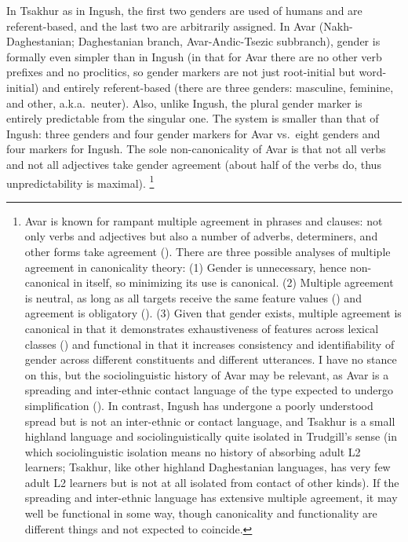\documentclass[output=collectionpaper]{langsci/langscibook}
\begin{document}
In Tsakhur as in Ingush, the first two genders are used of humans and are referent-based, and the last two are arbitrarily assigned. In Avar (Nakh\hyp{}Daghestanian; Daghestanian branch, Avar-Andic-Tsezic subbranch), gender is formally even simpler than in Ingush (in that for Avar there are no other verb prefixes and no proclitics, so gender markers are not just root-initial but word-initial) and entirely referent-based (there are three genders: masculine, feminine, and other, a.k.a.\ neuter). Also, unlike Ingush, the plural gender marker is entirely predictable from the singular one. The system is smaller than that of Ingush: three genders and four gender markers for Avar vs.\ eight genders and four markers for Ingush. The sole non-canonicality of Avar is that not all verbs and not all adjectives take gender agreement (about half of the verbs do, thus unpredictability is maximal).%
\footnote{%
\label{fn:Nich:8}%
Avar is known for rampant multiple agreement in phrases and clauses: not only verbs and adjectives but also a number of adverbs, determiners, and other forms take agreement (\citealt{Kibrik1985,Kibrik2003}). There are three possible analyses of multiple agreement in canonicality theory: (1) Gender is unnecessary, hence non-canonical in itself, so minimizing its use is canonical. (2) Multiple agreement is neutral, as long as all targets receive the same feature values (\citealt[513]{Corbett2016}) and agreement is obligatory (\citealt[14--15]{Corbett2006}). (3) Given that gender exists, multiple agreement is canonical in that it demonstrates exhaustiveness of features across lexical classes (\citealt[54]{Corbett2013c}) and functional in that it increases consistency and identifiability of gender across different constituents and different utterances. I have no stance on this, but the sociolinguistic history of Avar may be relevant, as Avar is a spreading and inter-ethnic contact language of the type expected to undergo simplification (\citealt{Trudgill2011}).  In contrast, Ingush has undergone a poorly understood spread but is not an inter-ethnic or contact language, and Tsakhur is a small highland language and sociolinguistically quite isolated in Trudgill's sense (in which sociolinguistic isolation means no history of absorbing adult L2 learners; Tsakhur, like other highland Daghestanian languages, has very few adult L2 learners but is not at all isolated from contact of other kinds). If the spreading and inter-ethnic language has extensive multiple agreement, it may well be functional in some way, though canonicality and functionality are different things and not expected to coincide.
}%
\end{document}
